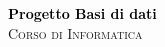 \begin{titlepage}
    \selectfont 

    
    \vspace*{3cm}
    
    \centering
    {\Huge \textbf{\textcolor{black}{Progetto Basi di dati}}}\\[1.5cm]
    \textsc{\LARGE Corso di Informatica}\\[0.5cm]
    \\[2cm]
    

\end{titlepage}
